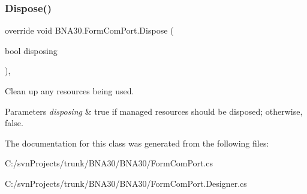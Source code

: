 \subsubsection{\texorpdfstring{Dispose()}{Dispose()}}
{\footnotesize\ttfamily override void B\+N\+A30.\+Form\+Com\+Port.\+Dispose (\begin{DoxyParamCaption}\item[{bool}]{disposing }\end{DoxyParamCaption})\hspace{0.3cm}{\ttfamily [inline]}, {\ttfamily [protected]}}



Clean up any resources being used. 


\begin{DoxyParams}{Parameters}
{\em disposing} & true if managed resources should be disposed; otherwise, false.\\
\hline
\end{DoxyParams}


The documentation for this class was generated from the following files\+:\begin{DoxyCompactItemize}
\item 
C\+:/svn\+Projects/trunk/\+B\+N\+A30/\+B\+N\+A30/Form\+Com\+Port.\+cs\item 
C\+:/svn\+Projects/trunk/\+B\+N\+A30/\+B\+N\+A30/Form\+Com\+Port.\+Designer.\+cs\end{DoxyCompactItemize}
